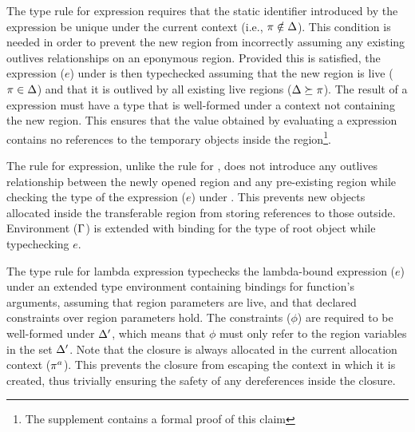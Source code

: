 The type rule for  expression requires that the static
identifier introduced by the expression be unique under the current
context (i.e., $\pi \notin \Delta$). This condition is needed in
order to prevent the new region from incorrectly assuming any existing
outlives relationships on an eponymous region. Provided this is
satisfied, the expression ($e$) under  is then
typechecked assuming that the new region is live ($\pi \in \Delta$)
and that it is outlived by all existing live regions ($\Delta
\succeq \pi$). The result of a  expression must have a
type that is well-formed under a context not containing the new
region. This ensures that the value obtained by evaluating a
 expression contains no references to the temporary
objects inside the region\footnote{The supplement contains a formal
proof of this claim}.

The rule for  expression, unlike the rule for ,
does not introduce any outlives relationship between the newly opened
region and any pre-existing region while checking the type of the
expression ($e$) under . This prevents new objects allocated
inside the transferable region from storing references to those
outside.  Environment ($\Gamma$) is extended with binding for the type
of root object while typechecking $e$. 

The type rule for lambda expression typechecks
the lambda-bound expression ($e$) under an extended type environment
containing bindings for function's arguments, assuming that region
parameters are live, and that declared constraints over region
parameters hold. The constraints ($\phi$) are required to be
well-formed under $\Delta'$, which means that $\phi$ must only refer
to the region variables in the set $\Delta'$. Note that the closure
is always allocated in the current allocation context ($\pi^a$). This
prevents the closure from escaping the context in which it is created,
thus trivially ensuring the safety of any dereferences inside the
closure.



